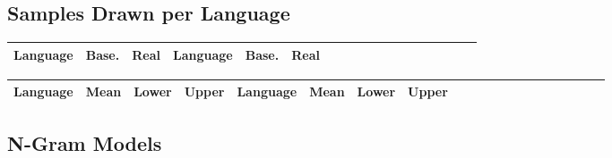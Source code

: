 \documentclass[11pt,letterpaper]{article}
\begin{document}






\subsection{Samples Drawn per Language}

\begin{center}
\begin{longtable}{l|ll||l|llllllllllllll}
	Language & Base. & Real & Language & Base. & Real \\ \hline

\end{longtable}
	\label{tab:samples}
\end{center}



\begin{center}
\begin{longtable}{l|lll||l|lllllllllllllll}
	Language & Mean & Lower & Upper & Language & Mean & Lower & Upper \\ \hline

\end{longtable}
	\label{tab:boot-g}
\end{center}




\subsection{N-Gram Models}






%
%
%
%
%
%
\end{document}

